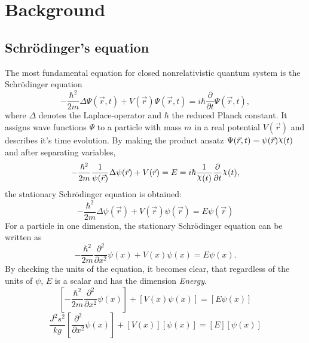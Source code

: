 \chapter{Background} \label{chap:background}
\section{Schrödinger's equation}
	The most fundamental equation for closed nonrelativistic quantum system is the Schrödinger equation \cite{Nielsen2010-xd} 
	\begin{equation}
		\label{eq:schroedinger}
		-\frac{\hbar^2}{2m}\Delta\Psi(\vec{r},t)+V(\vec{r})\Psi(\vec{r},t)=i\hbar\frac{\partial}{\partial t}\Psi(\vec{r},t),
	\end{equation}
	where $\Delta$ denotes the Laplace-operator and $\hbar$ the reduced Planck constant.
	It assigns wave functions $\Psi$ to a particle with mass $m$ in a real potential $V(\vec{r})$ and describes it's time evolution.
	By making the product ansatz $\Psi(\vec{r},t)=\psi(\vec{r})\Chi(t)$ and after separating variables, 
	\begin{equation}
		\label{eq:schroedinger_productansatz}
		-\frac{\hbar^2}{2m}\frac{1}{\psi(\vec{r})}\Delta\psi(\vec{r})+V(\vec{r})=E=i\hbar\frac{1}{\Chi(t)}\frac{\partial}{\partial t}\Chi(t),
	\end{equation}
	the stationary Schrödinger equation is obtained:
	\begin{equation}
		\label{eq:stat_schroedinger}
		-\frac{\hbar^2}{2m}\Delta\psi(\vec{r})+V(\vec{r})\psi(\vec{r})=E\psi(\vec{r})
	\end{equation}
	For a particle in one dimension, the stationary Schrödinger equation can be written as
	\begin{equation}
		\label{eq:1d_schroedinger}
		-\frac{\hbar^2}{2m}\frac{\partial^2}{\partial x^2}\psi(x)+V(x)\psi(x)=E\psi(x).
	\end{equation}
	By checking the units of the equation, it becomes clear, that regardless of the units of $\psi$, $E$ is a scalar and has the dimension \textit{Energy}.
  \begin{equation}
		\label{eq:1d_schroedinger_units_1}
    \left[-\frac{\hbar^2}{2m}\frac{\partial^2}{\partial x^2}\psi(x)\right]+\left[V(x)\psi(x)\right]=\left[E\psi(x)\right] 
  \end{equation}
  \begin{equation}
		\label{eq:1d_schroedinger_units_2}
    \frac{J^2s^2}{kg}\left[\frac{\partial^2}{\partial x^2}\psi(x)\right]+\left[V(x)\right]\left[\psi(x)\right]=\left[E\right]\left[\psi(x)\right]
  \end{equation}
